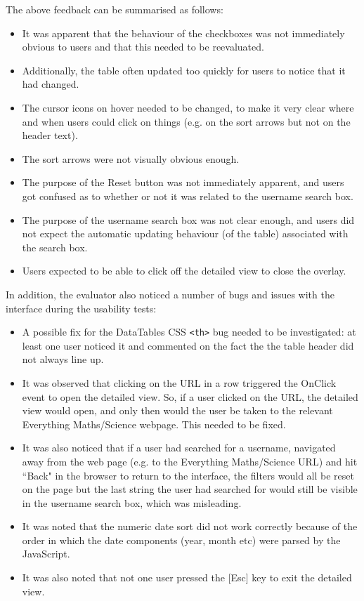 The above feedback can be summarised as follows:
\begin{itemize}
\item It was apparent that the behaviour of the checkboxes was not immediately obvious to users and that this needed to be reevaluated. 
\item Additionally, the table often updated too quickly for users to notice that it had changed. 
\item The cursor icons on hover needed to be changed, to make it very clear where and when users could click on things (e.g. on the sort arrows but not on the header text). 
\item The sort arrows were not visually obvious enough.
\item The purpose of the Reset button was not immediately apparent, and users got confused as to whether or not it was related to the username search box. 
\item The purpose of the username search box was not clear enough, and users did not expect the automatic updating behaviour (of the table) associated with the search box. 
\item Users expected to be able to click off the detailed view to close the overlay. 
\end{itemize}
In addition, the evaluator also noticed a number of bugs and issues with the interface during the usability tests:
\begin{itemize}
\item A possible fix for the DataTables CSS \verb|<th>| bug needed to be investigated: at least one user noticed it and commented on the fact the the table header did not always line up.
 \item It was observed that clicking on the URL in a row triggered the OnClick event to open the detailed view. So, if a user clicked on the URL, the detailed view would open, and only then would the user be taken to the relevant Everything Maths/Science webpage. This needed to be fixed. 
\item It was also noticed that if a user had searched for a username, navigated away from the web page (e.g. to the Everything Maths/Science URL) and hit ``Back" in the browser to return to the interface, the filters would all be reset on the page but the last string the user had searched for would still be visible in the username search box, which was misleading. 
\item It was noted that the numeric date sort did not work correctly because of the order in which the date components (year, month etc) were parsed by the JavaScript. 
\item It was also noted that not one user pressed the [Esc] key to exit the detailed view. 
\end{itemize}

